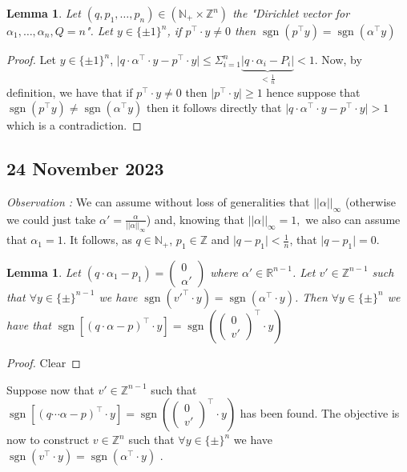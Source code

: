 \documentclass[a4paper,11pt,american]{article}
\newcommand{\N}{\mathbb{N}}
\newcommand{\R}{\mathbb{R}}
\newcommand{\Z}{\mathbb{Z}}
\newcommand{\norm}[1]{\vert\vert#1\vert\vert}
\DeclareMathOperator{\sign}{sgn}
\theoremstyle{plain}
\newtheorem{lemma}[theorem]{Lemma}
\theoremstyle{definition}
\begin{document}
\begin{lemma}
    Let $(q,p_1,\dots,p_n)\in (\N_+\times\Z^n)$ the "Dirichlet vector for $\alpha_1,\dots,\alpha_n,Q=n$". Let $y\in\{\pm 1\}^n$, if $p^\top\cdot y\neq 0$ then $\sign(p^\top y)=\sign(\alpha^\top y)$
\end{lemma}
\begin{proof}
    Let $y\in\{\pm 1\}^n$, $\vert q\cdot\alpha^\top\cdot y-p^\top\cdot y\vert\leq \Sigma_{i=1}^n\underbrace{\vert q\cdot\alpha_i-P_{i}\vert}_{< \frac{1}{n}}< 1$. Now, by definition, we have that if $p^\top\cdot y\neq 0$ then $\vert p^\top\cdot y\vert \geq 1$ hence suppose that $\sign(p^\top y)\neq\sign(\alpha^\top y)$ then it follows directly that $\vert q\cdot\alpha^\top\cdot y-p^\top\cdot y\vert> 1$ which is a contradiction.
\end{proof}
\subsection*{24 November 2023}
\emph{Observation :} We can assume without loss of generalities that $\norm{\alpha}_{\infty}$ (otherwise we could just take $\alpha'=\frac{\alpha}{\norm{\alpha}_{\infty}}$) and, knowing that $\norm{\alpha}_{\infty}=1,$ we also can assume that $\alpha_1=1$. It follows, as $q\in\N_+$, $p_1\in\Z$ and $\vert q-p_1\vert<\frac{1}{n}$, that $\vert q-p_1\vert=0$.\\
\begin{lemma}
    Let $(q\cdot \alpha_1-p_1)=\begin{pmatrix}
        0\\
        \alpha'
    \end{pmatrix}$ where $\alpha'\in\R^{n-1}$. Let $v'\in\Z^{n-1}$ such that $\forall y\in\{\pm\}^{n-1}$ we have $\sign(v'^\top\cdot y)=\sign(\alpha^\top\cdot y)$. Then $\forall y\in\{\pm\}^n$ we have that $\sign[(q\cdot\alpha-p)^\top\cdot y]=\sign(\begin{pmatrix}
        0\\
        v'
    \end{pmatrix}^\top\cdot y)$
\end{lemma}
\begin{proof}
    Clear
\end{proof}
Suppose now that $v'\in\Z^{n-1}$ such that $\sign[(q\cdots\alpha-p)^\top\cdot y]=\sign(\begin{pmatrix}
        0\\
        v'
    \end{pmatrix}^\top\cdot y)$ has been found. The objective is now to construct $v\in\Z^n$ such that $\forall y\in\{\pm\}^{n}$ we have $\sign(v^\top\cdot y)=\sign(\alpha^\top\cdot y)$ .\\
\end{document}
